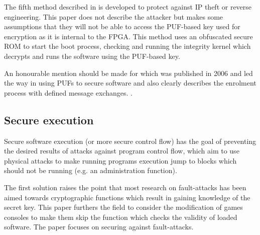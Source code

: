 The fifth method described in \cite{Gora2010} is developed to protect against IP theft or reverse engineering. This paper does not describe the attacker but makes some assumptions that they will not be able to access the PUF-based key used for encryption as it is internal to the FPGA. This method uses an obfuscated secure ROM to start the boot process, checking and running the integrity kernel which decrypts and runs the software using the PUF-based key. 


An honourable mention should be made for \cite{Simpson2006} which was published in 2006 and led the way in using PUFs to secure software and also clearly describes the enrolment process with defined message exchanges. .


\subsection{Secure execution}

Secure software execution (or more secure control flow) has the goal of preventing the desired results of attacks against program control flow, which aim to use physical attacks to make running programs execution jump to blocks which should not be running (e.g. an administration function).

The first solution \cite{Werner2016} raises the point that most research on fault-attacks has been aimed towards cryptographic functions which result in gaining knowledge of the secret key. This paper furthers the field to consider the modification of games consoles to make them skip the function which checks the validity of loaded software. The paper focuses on securing against fault-attacks.

